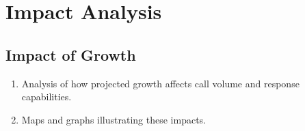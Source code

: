 \chapter{Impact Analysis}
\label{chap:impact_analysis}

\section{Impact of Growth}

\begin{enumerate}
    \item  Analysis of how projected growth affects call volume and response capabilities.
    \item Maps and graphs illustrating these impacts.
\end{enumerate}

   
    